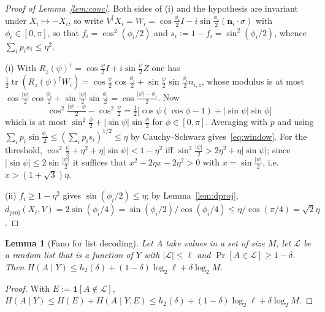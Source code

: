 \documentclass[aps,prx,twocolumn,superscriptaddress,nofootinbib,longbibliography]{revtex4-2}
\theoremstyle{plain}
\newtheorem{lemma}{Lemma}
\theoremstyle{definition}
\theoremstyle{remark}
\newcommand{\dproj}{d_{\mathrm{proj}}}
\newcommand{\tr}{\operatorname{tr}}
\begin{document}
\begin{proof}[Proof of Lemma~\ref{lem:conc}]
Both sides of (i) and the hypothesis are invariant under $X_i\mapsto-X_i$, so write $V^\dagger X_i=W_i=\cos\tfrac{\phi_i}2I-i\sin\tfrac{\phi_i}2(\mathbf n_i\!\cdot\!\sigma)$ with $\phi_i\in[0,\pi]$, so that $f_i=\cos^2(\phi_i/2)$ and $s_i:=1-f_i=\sin^2(\phi_i/2)$, whence $\sum_ip_is_i\le\eta^2$.

(i) With $R_z(\psi)^\dagger=\cos\tfrac\psi2I+i\sin\tfrac\psi2Z$ one has $\tfrac12\tr(R_z(\psi)^\dagger W_i)=\cos\tfrac\psi2\cos\tfrac{\phi_i}2+\sin\tfrac\psi2\sin\tfrac{\phi_i}2n_{i,z}$, whose modulus is at most $\cos\tfrac{|\psi|}2\cos\tfrac{\phi_i}2+\sin\tfrac{|\psi|}2\sin\tfrac{\phi_i}2=\cos\tfrac{|\psi|-\phi_i}2$. Now
\[
\cos^2\tfrac{|\psi|-\phi}2-\cos^2\tfrac\psi2=\tfrac12\big[\cos\psi(\cos\phi-1)+|\sin\psi|\sin\phi\big]
\]
which is at most $\sin^2\tfrac\phi2+|\sin\psi|\sin\tfrac\phi2$ for $\phi\in[0,\pi]$. Averaging with $p$ and using $\sum_ip_i\sin\tfrac{\phi_i}2\le(\sum_ip_is_i)^{1/2}\le\eta$ by Cauchy--Schwarz gives~\eqref{eq:window}. For the threshold, $\cos^2\tfrac\psi2+\eta^2+\eta|\sin\psi|<1-\eta^2$ iff $\sin^2\tfrac{|\psi|}2>2\eta^2+\eta|\sin\psi|$; since $|\sin\psi|\le2\sin\tfrac{|\psi|}2$ it suffices that $x^2-2\eta x-2\eta^2>0$ with $x=\sin\tfrac{|\psi|}2$, i.e.\ $x>(1+\sqrt3)\eta$.

(ii) $f_i\ge1-\eta^2$ gives $\sin(\phi_i/2)\le\eta$; by Lemma~\ref{lem:dproj}, $\dproj(X_i,V)=2\sin(\phi_i/4)=\sin(\phi_i/2)/\cos(\phi_i/4)\le\eta/\cos(\pi/4)=\sqrt2\eta$.
\end{proof}

\begin{lemma}[Fano for list decoding]\label{lem:fanolist}
Let $A$ take values in a set of size $M$, let $\mathcal L$ be a random list that is a function of $Y$ with $|\mathcal L|\le\ell$ and $\Pr[A\in\mathcal L]\ge1-\delta$. Then $H(A\mid Y)\le h_2(\delta)+(1-\delta)\log_2\ell+\delta\log_2M$.
\end{lemma}
\begin{proof}
With $E:=\mathbf1[A\notin\mathcal L]$, $H(A\mid Y)\le H(E)+H(A\mid Y,E)\le h_2(\delta)+(1-\delta)\log_2\ell+\delta\log_2M$.
\end{proof}
\end{document}
